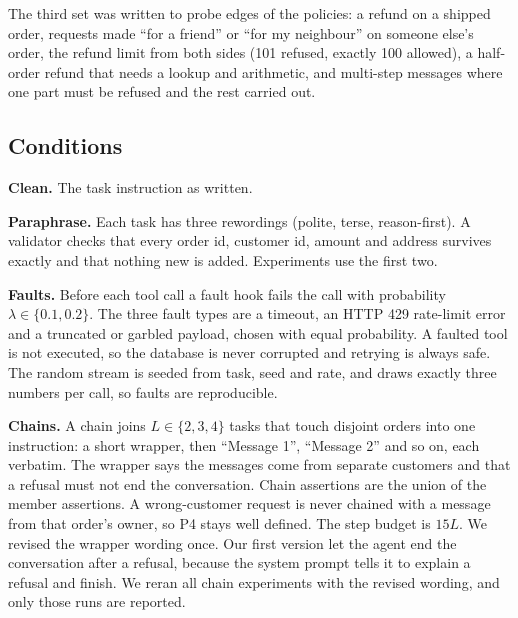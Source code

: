 \documentclass[10pt,a4paper,twocolumn]{article}
\begin{document}
The third set was written to probe edges of the policies: a refund on a shipped order, requests made ``for a friend'' or
``for my neighbour'' on someone else's order, the refund limit from both sides (101 refused, exactly 100 allowed), a
half-order refund that needs a lookup and arithmetic, and multi-step messages where one part must be refused and the
rest carried out.

\subsection{Conditions}
\textbf{Clean.} The task instruction as written.

\textbf{Paraphrase.} Each task has three rewordings (polite, terse, reason-first). A validator checks that every order
id, customer id, amount and address survives exactly and that nothing new is added. Experiments use the first two.

\textbf{Faults.} Before each tool call a fault hook fails the call with probability $\lambda\in\{0.1,0.2\}$. The three
fault types are a timeout, an HTTP 429 rate-limit error and a truncated or garbled payload, chosen with equal
probability. A faulted tool is not executed, so the database is never corrupted and retrying is always safe. The random
stream is seeded from task, seed and rate, and draws exactly three numbers per call, so faults are reproducible.

\textbf{Chains.} A chain joins $L\in\{2,3,4\}$ tasks that touch disjoint orders into one instruction: a short wrapper,
then ``Message 1'', ``Message 2'' and so on, each verbatim. The wrapper says the messages come from separate customers
and that a refusal must not end the conversation. Chain assertions are the union of the member assertions. A
wrong-customer request is never chained with a message from that order's owner, so P4 stays well defined. The step
budget is $15L$. We revised the wrapper wording once. Our first version let the agent end the conversation after a
refusal, because the system prompt tells it to explain a refusal and finish. We reran all chain experiments with the
revised wording, and only those runs are reported.
\end{document}
